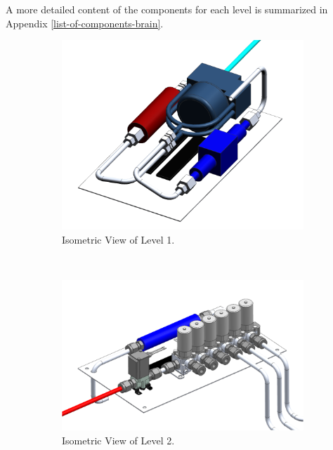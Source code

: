 A more detailed content of the components for each level is summarized in Appendix \ref{list-of-components-brain}.
\begin{figure}[H]
    \centering
    \begin{subfigure}[b]{0.3\textwidth}
    \centering
    \includegraphics[width=\textwidth]{4-experiment-design/img/Mechanical/Level_1.png}
    \caption{Isometric View of Level 1.}
    \label{level_1}
    \end{subfigure}
    ~
    \begin{subfigure}[b]{0.3\textwidth}
    \centering
    \includegraphics[width=\textwidth]{4-experiment-design/img/Mechanical/Level_2.png}
    \caption{Isometric View of Level 2.}
    \label{level_2}
    \end{subfigure}
    ~
    \begin{subfigure}[b]{0.3\textwidth}

\end{subfigure}
\end{figure}
